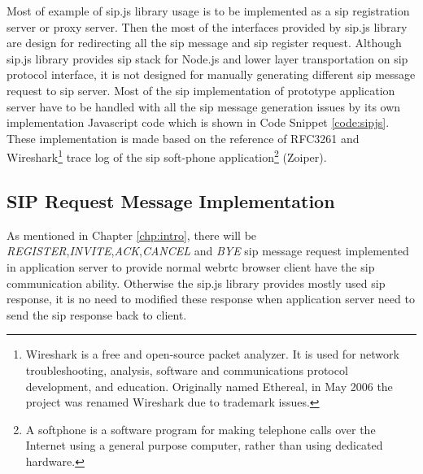 \par Most of example of sip.js library usage is to be implemented as a \gls{sip} registration server or proxy server. Then the most of the interfaces provided by sip.js library are design for redirecting all the \gls{sip} message and \gls{sip} register request. Although sip.js library provides \gls{sip} stack for Node.js and lower layer transportation on \gls{sip} protocol interface, it is not designed for manually generating different \gls{sip} message request to \gls{sip} server. Most of the \gls{sip} implementation of prototype application server have to be handled with all the \gls{sip} message generation issues by its own implementation Javascript code which is shown in Code Snippet \ref{code:sipjs}. These implementation is made based on the reference of RFC3261 and Wireshark\footnote{Wireshark is a free and open-source packet analyzer. It is used for network troubleshooting, analysis, software and communications protocol development, and education. Originally named Ethereal, in May 2006 the project was renamed Wireshark due to trademark issues.\cite{wiki:wireshark}} trace log of the \gls{sip} soft-phone application\footnote{A softphone is a software program for making telephone calls over the Internet using a general purpose computer, rather than using dedicated hardware.\cite{wiki:softphone}} (Zoiper).

\subsection{SIP Request Message Implementation}

\par As mentioned in Chapter \ref{chp:intro}, there will be \textit{REGISTER},\textit{INVITE},\textit{ACK},\textit{CANCEL} and \textit{BYE} \gls{sip} message request implemented in application server to provide normal \gls{webrtc} browser client have the \gls{sip} communication ability. Otherwise the sip.js library provides mostly used \gls{sip} response, it is no need to modified these response when application server need to send the \gls{sip} response back to client.

